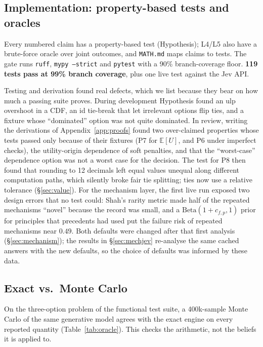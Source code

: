\documentclass[11pt]{article}
\theoremstyle{definition}
\begin{document}
\subsection{Implementation: property-based tests and oracles}

Every numbered claim has a property-based test (Hypothesis); L4/L5 also have a brute-force oracle
over joint outcomes, and \texttt{MATH.md} maps claims to tests. The gate runs \texttt{ruff},
\texttt{mypy --strict} and \texttt{pytest} with a 90\% branch-coverage floor. \textbf{119 tests pass
at 99\% branch coverage}, plus one live test against the Jev API.

Testing and derivation found real defects, which we list because they bear on how much a passing
suite proves. During development Hypothesis found an ulp overshoot in a CDF, an id tie-break that let
irrelevant options flip ties, and a fixture whose ``dominated'' option was not quite dominated. In
review, writing the derivations of Appendix~\ref{app:proofs} found two over-claimed properties
whose tests passed only because of their fixtures (P7 for $\mathbb E[U]$, and P6 under imperfect
checks), the utility-origin dependence of soft penalties, and that the ``worst-case'' dependence
option was not a worst case for the decision. The test for P8 then found that rounding to 12
decimals left equal values unequal along different computation paths, which silently broke fair tie
splitting; ties now use a relative tolerance (\S\ref{sec:value}). For the mechanism layer, the first live run
exposed two design errors that no test could: Shah's rarity metric made half of the repeated
mechanisms ``novel'' because the record was small, and a $\mathrm{Beta}(1+c_{f,p},1)$ prior for
principles that precedents had used put the failure risk of repeated mechanisms near $0.49$. Both
defaults were changed after that first analysis (\S\ref{sec:mechanism}); the results in
\S\ref{sec:mechjev} re-analyse the same cached answers with the new defaults, so the choice of
defaults was informed by these data.

\subsection{Exact vs.\ Monte Carlo}

On the three-option problem of the functional test suite, a 400k-sample Monte Carlo of the same
generative model agrees with the exact engine on every reported quantity (Table~\ref{tab:oracle}).
This checks the arithmetic, not the beliefs it is applied to.
\end{document}
